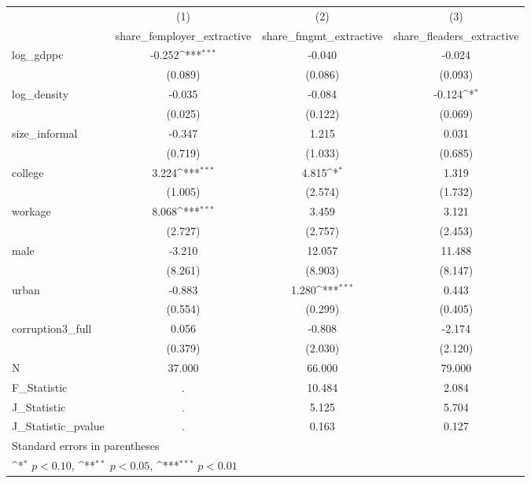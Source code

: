 {
\def\sym#1{\ifmmode^{#1}\else\(^{#1}\)\fi}
\begin{tabular}{l*{3}{c}}
\hline\hline
            &\multicolumn{1}{c}{(1)}&\multicolumn{1}{c}{(2)}&\multicolumn{1}{c}{(3)}\\
            &\multicolumn{1}{c}{share\_femployer\_extractive}&\multicolumn{1}{c}{share\_fmgmt\_extractive}&\multicolumn{1}{c}{share\_fleaders\_extractive}\\
\hline
log\_gdppc   &      -0.252\sym{***}&      -0.040         &      -0.024         \\
            &     (0.089)         &     (0.086)         &     (0.093)         \\
[1em]
log\_density &      -0.035         &      -0.084         &      -0.124\sym{*}  \\
            &     (0.025)         &     (0.122)         &     (0.069)         \\
[1em]
size\_informal&      -0.347         &       1.215         &       0.031         \\
            &     (0.719)         &     (1.033)         &     (0.685)         \\
[1em]
college     &       3.224\sym{***}&       4.815\sym{*}  &       1.319         \\
            &     (1.005)         &     (2.574)         &     (1.732)         \\
[1em]
workage     &       8.068\sym{***}&       3.459         &       3.121         \\
            &     (2.727)         &     (2.757)         &     (2.453)         \\
[1em]
male        &      -3.210         &      12.057         &      11.488         \\
            &     (8.261)         &     (8.903)         &     (8.147)         \\
[1em]
urban       &      -0.883         &       1.280\sym{***}&       0.443         \\
            &     (0.554)         &     (0.299)         &     (0.405)         \\
[1em]
corruption3\_full&       0.056         &      -0.808         &      -2.174         \\
            &     (0.379)         &     (2.030)         &     (2.120)         \\
\hline
N           &      37.000         &      66.000         &      79.000         \\
F\_Statistic &           .         &      10.484         &       2.084         \\
J\_Statistic &           .         &       5.125         &       5.704         \\
J\_Statistic\_pvalue&           .         &       0.163         &       0.127         \\
\hline\hline
\multicolumn{4}{l}{\footnotesize Standard errors in parentheses}\\
\multicolumn{4}{l}{\footnotesize \sym{*} \(p<0.10\), \sym{**} \(p<0.05\), \sym{***} \(p<0.01\)}\\
\end{tabular}
}
